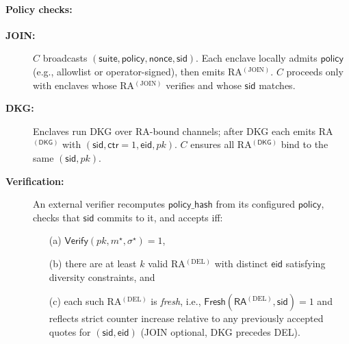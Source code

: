 \documentclass[runningheads,orivec]{llncs}
\begin{document}
\paragraph{Policy checks:}
\begin{description}
  \item[\textbf{JOIN:}] $C$ broadcasts $(\mathsf{suite},\mathsf{policy},\mathsf{nonce},\mathsf{sid})$.
  Each enclave locally admits $\mathsf{policy}$ (e.g., allowlist or operator-signed), then emits RA$^{(\mathrm{JOIN})}$.
  $C$ proceeds only with enclaves whose RA$^{(\mathrm{JOIN})}$ verifies and whose $\mathsf{sid}$ matches.
  \item[\textbf{DKG:}] Enclaves run DKG over RA-bound channels; after DKG each emits RA$^{(\mathsf{DKG})}$ with $(\mathsf{sid},\mathsf{ctr}{=}1,\mathsf{eid},pk)$.
  $C$ ensures all RA$^{(\mathsf{DKG})}$ bind to the same $(\mathsf{sid},pk)$.
  \item[\textbf{Verification:}] An external verifier recomputes $\mathsf{policy\_hash}$ from its configured $\mathsf{policy}$,
  checks that $\mathsf{sid}$ commits to it, and accepts iff:
  \begin{enumerate}
    \item[(a)] $\mathsf{Verify}(pk,m^{\star},\sigma^{\star})=1$,
    \item[(b)] there are at least $k$ valid RA$^{(\mathrm{DEL})}$ with distinct $\mathsf{eid}$ satisfying diversity constraints, and
    \item[(c)] each such RA$^{(\mathrm{DEL})}$ is \emph{fresh}, i.e., $\textsf{Fresh}(\mathsf{RA}^{(\mathrm{DEL})},\mathsf{sid}){=}1$ and reflects strict counter increase relative to any previously accepted quotes for $(\mathsf{sid},\mathsf{eid})$ (JOIN optional, DKG precedes DEL).
  \end{enumerate}
\end{description}
\end{document}
